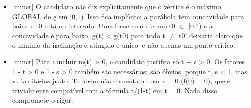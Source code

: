\documentclass{article}%
\begin{document}
\begin{itemize}%
\item%
{[}minor{]} O candidato não diz explicitamente que o vértice é o máximo GLOBAL de g em {[}0,1). Isso fica implícito: a parábola tem concavidade para baixo e t0 está no intervalo. Uma frase como 'como t0 $\in$ {[}0,1) e a concavidade é para baixo, g(t) < g(t0) para todo t $\neq$ t0' deixaria claro que o mínimo da inclinação é atingido e único, e não apenas um ponto crítico.%
\item%
{[}minor{]} Para concluir m(t) > 0, o candidato justifica só t + s > 0. Os fatores 1 - t > 0 e 1 - s > 0 também são necessários; são óbvios, porque t, s < 1, mas valia citá{-}los junto. Também não comenta o caso x = 0 (f(0) = 0), que é trivialmente compatível com a fórmula t/(1-t) em t = 0. Nada disso compromete o rigor.%
\end{itemize}%
\end{document}
